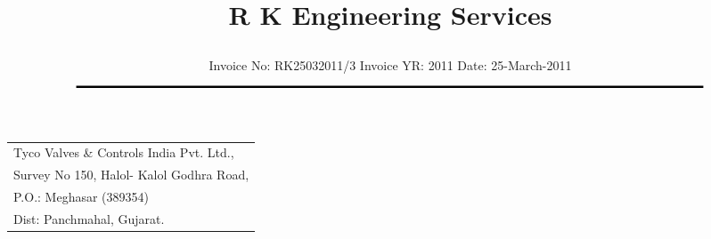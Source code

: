 \documentclass[11pt]{article}
\title{\vspace*{-1.5cm} \centerline{ \Huge \bf \hspace{0cm} R K Engineering Services}\vspace*{-0.75cm}}
\author{%
 \scriptsize Invoice No: RK25032011/3  \hspace*{4cm}  Invoice YR: 2011 \hspace*{4cm} Date: 25-March-2011\\
$\rule{7.0in}{0.5mm}$}
\date{}
\begin{document}
\maketitle
\thispagestyle{empty}
\vspace*{0.5cm}	
\begin{flushleft}
{\footnotesize
\begin{tabular}{l}
Tyco Valves \& Controls India Pvt. Ltd.,\\
Survey No 150, Halol- Kalol Godhra Road,\\
P.O.:  Meghasar (389354)\\
Dist: Panchmahal, Gujarat.\\
\end{tabular}
}
\end{flushleft}

\vspace*{1cm}

\vspace*{0.5cm}

\end{document}
